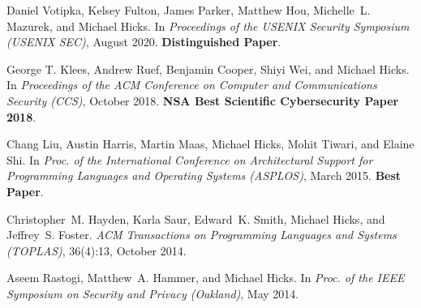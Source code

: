 \documentclass[11pt]{article}
\begin{document}
\begin{description}
\item 
  Daniel Votipka, Kelsey Fulton, James Parker, Matthew Hou, Michelle~L. Mazurek,
  and Michael Hicks.
In {\em Proceedings of the USENIX Security Symposium (USENIX SEC)},
  August 2020. \textbf{Distinguished Paper}.


\item George T. Klees, Andrew Ruef, Benjamin Cooper, Shiyi Wei, and
  Michael Hicks.
  In \emph{Proceedings of the ACM
  Conference on Computer and Communications Security (CCS)}, October
  2018. \textbf{NSA Best Scientific Cybersecurity Paper 2018}.


    
\item
  Chang Liu, Austin Harris, Martin Maas, Michael Hicks, Mohit Tiwari,
  and Elaine Shi.
  In {\em
    Proc. of the International Conference on Architectural
    Support for Programming Languages and Operating Systems (ASPLOS)},
  March 2015.   \textbf{Best Paper}.
 
\item
Christopher~M. Hayden, Karla Saur, Edward~K. Smith, Michael Hicks, and
  Jeffrey~S. Foster.
{\em {ACM} Transactions on Programming Languages and Systems
  (TOPLAS)}, 36(4):13, October 2014.
  

 \item
 Aseem Rastogi, Matthew~A. Hammer, and Michael Hicks.
  In {\em Proc. of the {IEEE} Symposium on Security and Privacy
   (Oakland)}, May 2014.

  

\end{description}
\end{document}
